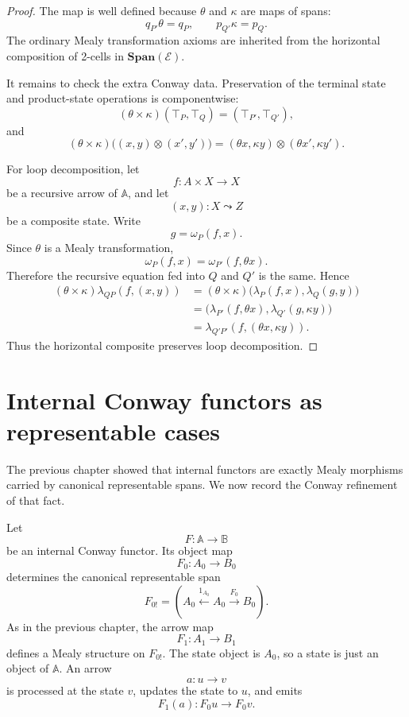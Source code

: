 \begin{proof}
The map is well defined because \(\theta\) and \(\kappa\) are maps of spans:
\[
q_{P'}\theta=q_P,
\qquad
p_{Q'}\kappa=p_Q.
\]
The ordinary Mealy transformation axioms are inherited from the horizontal
composition of 2-cells in \(\mathbf{Span}(\mathcal E)\).

It remains to check the extra Conway data.  Preservation of the terminal
state and product-state operations is componentwise:
\[
(\theta\times\kappa)(\top_P,\top_Q)
=
(\top_{P'},\top_{Q'}),
\]
and
\[
(\theta\times\kappa)
\bigl((x,y)\otimes(x',y')\bigr)
=
(\theta x,\kappa y)\otimes(\theta x',\kappa y').
\]

For loop decomposition, let
\[
f:A\times X\to X
\]
be a recursive arrow of \(\mathbb A\), and let
\[
(x,y):X\leadsto Z
\]
be a composite state.  Write
\[
g=\omega_P(f,x).
\]
Since \(\theta\) is a Mealy transformation,
\[
\omega_P(f,x)=\omega_{P'}(f,\theta x).
\]
Therefore the recursive equation fed into \(Q\) and \(Q'\) is the same.  Hence
\[
\begin{aligned}
(\theta\times\kappa)\lambda_{QP}(f,(x,y))
&=
(\theta\times\kappa)
\bigl(\lambda_P(f,x),\lambda_Q(g,y)\bigr)
\\
&=
\bigl(\lambda_{P'}(f,\theta x),\lambda_{Q'}(g,\kappa y)\bigr)
\\
&=
\lambda_{Q'P'}(f,(\theta x,\kappa y)).
\end{aligned}
\]
Thus the horizontal composite preserves loop decomposition.
\end{proof}

\section{Internal Conway functors as representable cases}
\label{sec:internal-conway-functors-representable}

The previous chapter showed that internal functors are exactly Mealy morphisms
carried by canonical representable spans.  We now record the Conway refinement
of that fact.

Let
\[
F:\mathbb A\to\mathbb B
\]
be an internal Conway functor.  Its object map
\[
F_0:A_0\to B_0
\]
determines the canonical representable span
\[
F_{0!}
=
\left(
A_0
\xleftarrow{1_{A_0}}
A_0
\xrightarrow{F_0}
B_0
\right).
\]
As in the previous chapter, the arrow map
\[
F_1:A_1\to B_1
\]
defines a Mealy structure on \(F_{0!}\).  The state object is \(A_0\), so a
state is just an object of \(\mathbb A\).  An arrow
\[
a:u\to v
\]
is processed at the state \(v\), updates the state to \(u\), and emits
\[
F_1(a):F_0u\to F_0v.
\]

